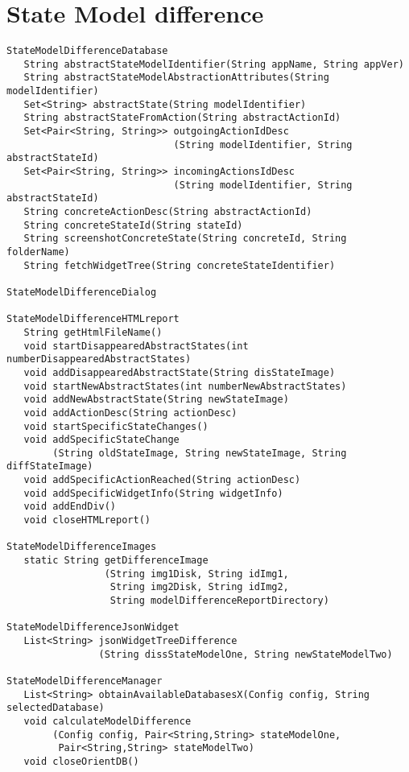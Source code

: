 \section{State Model difference}
\begin{verbatim}
StateModelDifferenceDatabase
   String abstractStateModelIdentifier(String appName, String appVer)
   String abstractStateModelAbstractionAttributes(String modelIdentifier)
   Set<String> abstractState(String modelIdentifier)
   String abstractStateFromAction(String abstractActionId)
   Set<Pair<String, String>> outgoingActionIdDesc
                             (String modelIdentifier, String abstractStateId)
   Set<Pair<String, String>> incomingActionsIdDesc
                             (String modelIdentifier, String abstractStateId)
   String concreteActionDesc(String abstractActionId)
   String concreteStateId(String stateId)
   String screenshotConcreteState(String concreteId, String folderName)
   String fetchWidgetTree(String concreteStateIdentifier)

StateModelDifferenceDialog

StateModelDifferenceHTMLreport
   String getHtmlFileName()
   void startDisappearedAbstractStates(int numberDisappearedAbstractStates)
   void addDisappearedAbstractState(String disStateImage)
   void startNewAbstractStates(int numberNewAbstractStates)
   void addNewAbstractState(String newStateImage)
   void addActionDesc(String actionDesc)
   void startSpecificStateChanges()
   void addSpecificStateChange
        (String oldStateImage, String newStateImage, String diffStateImage)
   void addSpecificActionReached(String actionDesc)
   void addSpecificWidgetInfo(String widgetInfo)
   void addEndDiv()
   void closeHTMLreport()

StateModelDifferenceImages
   static String getDifferenceImage
                 (String img1Disk, String idImg1, 
                  String img2Disk, String idImg2, 
                  String modelDifferenceReportDirectory)

StateModelDifferenceJsonWidget
   List<String> jsonWidgetTreeDifference
                (String dissStateModelOne, String newStateModelTwo)

StateModelDifferenceManager
   List<String> obtainAvailableDatabasesX(Config config, String selectedDatabase)
   void calculateModelDifference
        (Config config, Pair<String,String> stateModelOne, 
         Pair<String,String> stateModelTwo)
   void closeOrientDB()
\end{verbatim}